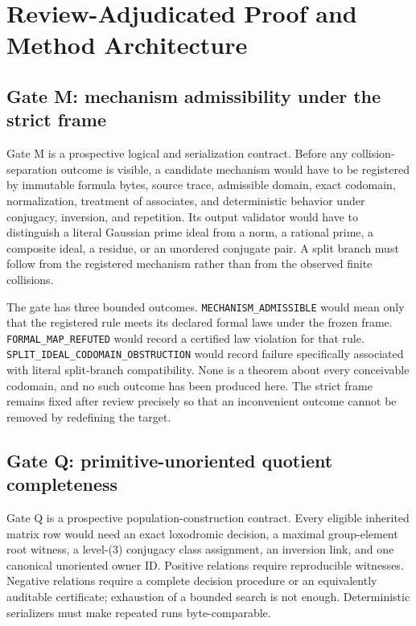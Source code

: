\documentclass[11pt,a4paper]{article}
\begin{document}
\section{Review-Adjudicated Proof and Method Architecture}

\subsection{Gate M: mechanism admissibility under the strict frame}

Gate M is a prospective logical and serialization contract. Before any collision-separation outcome is visible, a candidate mechanism would have to be registered by immutable formula bytes, source trace, admissible domain, exact codomain, normalization, treatment of associates, and deterministic behavior under conjugacy, inversion, and repetition. Its output validator would have to distinguish a literal Gaussian prime ideal from a norm, a rational prime, a composite ideal, a residue, or an unordered conjugate pair. A split branch must follow from the registered mechanism rather than from the observed finite collisions.

The gate has three bounded outcomes. \texttt{MECHANISM\_ADMISSIBLE} would mean only that the registered rule meets its declared formal laws under the frozen frame. \texttt{FORMAL\_MAP\_REFUTED} would record a certified law violation for that rule. \texttt{SPLIT\_IDEAL\_CODOMAIN\_OBSTRUCTION} would record failure specifically associated with literal split-branch compatibility. None is a theorem about every conceivable codomain, and no such outcome has been produced here. The strict frame remains fixed after review precisely so that an inconvenient outcome cannot be removed by redefining the target.

\subsection{Gate Q: primitive-unoriented quotient completeness}

Gate Q is a prospective population-construction contract. Every eligible inherited matrix row would need an exact loxodromic decision, a maximal group-element root witness, a level-(3) conjugacy class assignment, an inversion link, and one canonical unoriented owner ID. Positive relations require reproducible witnesses. Negative relations require a complete decision procedure or an equivalently auditable certificate; exhaustion of a bounded search is not enough. Deterministic serializers must make repeated runs byte-comparable.
\end{document}

